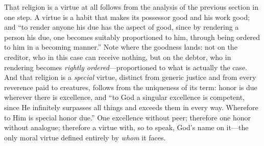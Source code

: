 That religion is a virtue at all follows from the analysis of the previous section in one step. A virtue is a habit that makes its possessor good and his work good; and ``to render anyone his due has the aspect of good, since by rendering a person his due, one becomes suitably proportioned to him, through being ordered to him in a becoming manner.'' Note where the goodness lands: not on the creditor, who in this case can receive nothing, but on the debtor, who in rendering becomes \emph{rightly ordered}---proportioned to what is actually the case. And that religion is a \emph{special} virtue, distinct from generic justice and from every reverence paid to creatures, follows from the uniqueness of its term: honor is due wherever there is excellence, and ``to God a singular excellence is competent, since He infinitely surpasses all things and exceeds them in every way. Wherefore to Him is special honor due.'' One excellence without peer; therefore one honor without analogue; therefore a virtue with, so to speak, God's name on it---the only moral virtue defined entirely by \emph{whom} it faces.


